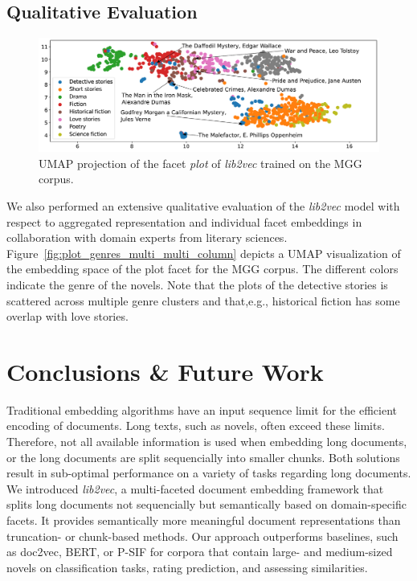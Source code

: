 \documentclass[11pt]{article}
\begin{document}
\subsection{Qualitative Evaluation}

\begin{figure}[h]
	\centering
	\includegraphics[width=\textwidth]{figures/plot_genres_multi_column.pdf}
	\caption{UMAP projection of the facet \textit{plot} of \emph{lib2vec} trained on the MGG corpus.}
	\label{fig:plot_genres_multi_column}
\end{figure}

We also performed an extensive qualitative evaluation of the \emph{lib2vec} model with respect to aggregated representation and individual facet embeddings in collaboration with domain experts from literary sciences.
Figure~\ref{fig:plot_genres_multi_multi_column} depicts a UMAP visualization of the embedding space of the plot facet for the MGG corpus. The different colors indicate the genre of the novels.
Note that the plots of the detective stories is scattered across multiple genre clusters and that,e.g., historical fiction has some overlap with love stories.


\section{Conclusions \& Future Work}

Traditional embedding algorithms have an input sequence limit for the efficient encoding of documents.
Long texts, such as novels, often exceed these limits.
Therefore, not all available information is used when embedding long documents, or the long documents are split sequencially into smaller chunks.
Both solutions result in sub-optimal performance on a variety of tasks regarding long documents.
We introduced \emph{lib2vec}, a multi-faceted document embedding framework that splits long documents not sequencially but semantically based on domain-specific facets.
It provides semantically more meaningful document representations than truncation- or chunk-based methods.
Our approach outperforms baselines, such as doc2vec, BERT, or P-SIF for corpora that contain large- and medium-sized novels on classification tasks, rating prediction, and assessing similarities.
\end{document}
